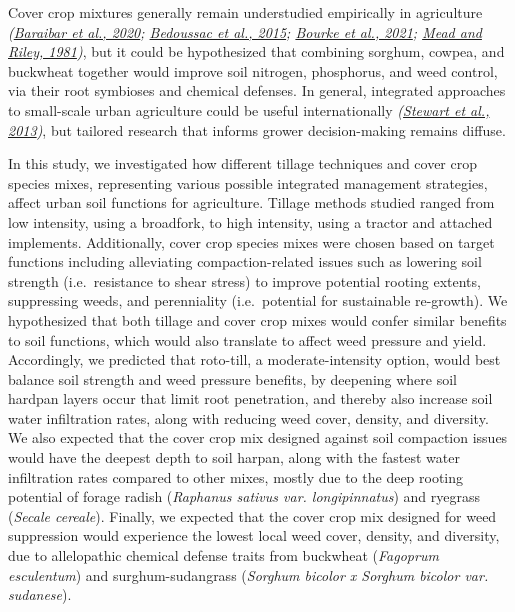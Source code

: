 \documentclass[
  12pt,
]{article}
\begin{document}
Cover crop mixtures generally remain understudied empirically in agriculture \emph{(\protect\hyperlink{ref-baraibar20}{Baraibar et al., 2020}; \protect\hyperlink{ref-bedoussac15}{Bedoussac et al., 2015}; \protect\hyperlink{ref-bourke21}{Bourke et al., 2021}; \protect\hyperlink{ref-mead81}{Mead and Riley, 1981})}, but it could be hypothesized that combining sorghum, cowpea, and buckwheat together would improve soil nitrogen, phosphorus, and weed control, via their root symbioses and chemical defenses.
In general, integrated approaches to small-scale urban agriculture could be useful internationally \emph{(\protect\hyperlink{ref-stewart13}{Stewart et al., 2013})}, but tailored research that informs grower decision-making remains diffuse.

In this study, we investigated how different tillage techniques and cover crop species mixes, representing various possible integrated management strategies, affect urban soil functions for agriculture.
Tillage methods studied ranged from low intensity, using a broadfork, to high intensity, using a tractor and attached implements.
Additionally, cover crop species mixes were chosen based on target functions including alleviating compaction-related issues such as lowering soil strength (i.e.~resistance to shear stress) to improve potential rooting extents, suppressing weeds, and perenniality (i.e.~potential for sustainable re-growth).
We hypothesized that both tillage and cover crop mixes would confer similar benefits to soil functions, which would also translate to affect weed pressure and yield.
Accordingly, we predicted that roto-till, a moderate-intensity option, would best balance soil strength and weed pressure benefits, by deepening where soil hardpan layers occur that limit root penetration, and thereby also increase soil water infiltration rates, along with reducing weed cover, density, and diversity.
We also expected that the cover crop mix designed against soil compaction issues would have the deepest depth to soil harpan, along with the fastest water infiltration rates compared to other mixes, mostly due to the deep rooting potential of forage radish (\emph{Raphanus sativus var. longipinnatus}) and ryegrass (\emph{Secale cereale}).
Finally, we expected that the cover crop mix designed for weed suppression would experience the lowest local weed cover, density, and diversity, due to allelopathic chemical defense traits from buckwheat (\emph{Fagoprum esculentum}) and surghum-sudangrass (\emph{Sorghum bicolor x Sorghum bicolor var. sudanese}).
\end{document}

